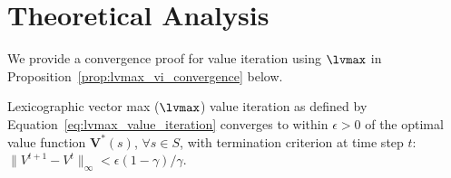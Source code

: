 \section{Theoretical Analysis}
\label{sec:theoretical_analysis}

We provide a convergence proof for value iteration using $\lvmax$ in Proposition~\ref{prop:lvmax_vi_convergence} below.

\begin{proposition}
    \label{prop:lvmax_vi_convergence}
    Lexicographic vector max ($\lvmax$) value iteration as defined by Equation~\ref{eq:lvmax_value_iteration} converges to within $\epsilon > 0$ of the optimal value function $\mathbf{V}^*(s)$, $\forall s \in S$, with termination criterion at time step $t$: $\|V^{t+1} - V^t\|_\infty < \epsilon (1 - \gamma) / \gamma$.
\end{proposition}

